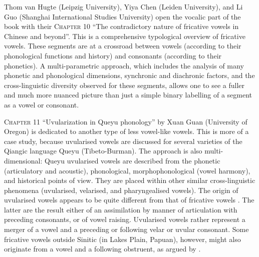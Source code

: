\documentclass[output=paper]{langscibook}
\begin{document}
Thom van Hugte (Leipzig University), Yiya Chen (Leiden University), and Li Guo (Shanghai International Studies University) open the vocalic part of the book with their \textsc{Chapter 10} “The contradictory nature of fricative vowels in Chinese and beyond”. This is a comprehensive typological overview of fricative vowels. These segments are at a crossroad between vowels (according to their phonological functions and history) and consonants (according to their phonetics). A multi-parametric approach, which includes the analysis of many phonetic and phonological dimensions, synchronic and diachronic factors, and the cross-linguistic diversity observed for these segments, allows one to see a fuller and much more nuanced picture than just a simple binary labelling of a segment as a vowel or consonant.

\textsc{Chapter 11} “Uvularization in Queyu phonology” by Xuan Guan (University of Oregon) is dedicated to another type of less vowel-like vowels. This is more of a case study, because uvularised vowels are discussed for several varieties of the Qiangic language Queyu (Tibeto-Burman). The approach is also multi-dimensional: Queyu uvularised vowels are described from the phonetic (articulatory and acoustic), phonological, morphophonological (vowel harmony), and historical points of view. They are placed within other similar cross-linguistic phenomena (uvularised, velarised, and pharyngealised vowels). The origin of uvularised vowels appears to be quite different from that of fricative vowels . The latter are the result either of an assimilation by manner of articulation with preceding consonants, or of vowel raising. Uvularised vowels rather represent a merger of a vowel and a preceding or following velar or uvular consonant. Some fricative vowels outside Sinitic (in Lakes Plain, Papuan), however, might also originate from a vowel and a following obstruent, as argued by .
\end{document}
